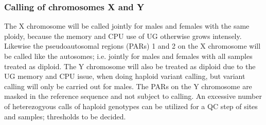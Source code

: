 %

\subsubsection{Calling of chromosomes X and Y}
The X chromosome will be called jointly for males and females with the same ploidy, because the memory and CPU use of UG otherwise grows intensely. Likewise the pseudoautosomal regions (PARs) 1 and 2 on the X chromosome will be called like the autosomes; i.e. jointly for males and females with all samples treated as diploid. The Y chromosome will also be treated as diploid due to the UG memory and CPU issue, when doing haploid variant calling, but variant calling will only be carried out for males. The PARs on the Y chromosome are masked in the reference sequence and not subject to calling. An excessive number of heterezogyous calls of haploid genotypes can be utilized for a QC step of sites and samples; thresholds to be decided.

%

